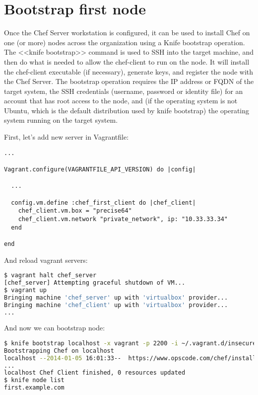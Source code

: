 \section{Bootstrap first node}

Once the Chef Server workstation is configured, it can be used to install Chef on one (or more) nodes across the organization using a Knife bootstrap operation. The <<knife bootstrap>> command is used to SSH into the target machine, and then do what is needed to allow the chef-client to run on the node. It will install the chef-client executable (if necessary), generate keys, and register the node with the Chef Server. The bootstrap operation requires the IP address or FQDN of the target system, the SSH credentials (username, password or identity file) for an account that has root access to the node, and (if the operating system is not Ubuntu, which is the default distribution used by knife bootstrap) the operating system running on the target system.

First, let's add new server in Vagrantfile:

\begin{lstlisting}[label=lst:my-server-cloud-node1,title=my-server-cloud/Vagrantfile]
...

Vagrant.configure(VAGRANTFILE_API_VERSION) do |config|

  ...

  config.vm.define :chef_first_client do |chef_client|
    chef_client.vm.box = "precise64"
    chef_client.vm.network "private_network", ip: "10.33.33.34"
  end

end
\end{lstlisting}

And reload vagrant servers:

\begin{lstlisting}[language=Bash,label=lst:my-server-cloud-node2]
$ vagrant halt chef_server
[chef_server] Attempting graceful shutdown of VM...
$ vagrant up
Bringing machine 'chef_server' up with 'virtualbox' provider...
Bringing machine 'chef_client' up with 'virtualbox' provider...
...
\end{lstlisting}

And now we can bootstrap node:

\begin{lstlisting}[language=Bash,label=lst:my-server-cloud-node3]
$ knife bootstrap localhost -x vagrant -p 2200 -i ~/.vagrant.d/insecure_private_key -N first.example.com --sudo
Bootstrapping Chef on localhost
localhost --2014-01-05 16:01:33--  https://www.opscode.com/chef/install.sh
...
localhost Chef Client finished, 0 resources updated
$ knife node list
first.example.com
\end{lstlisting}

